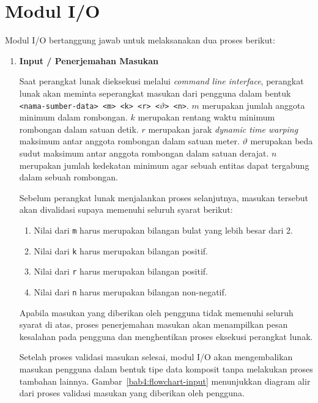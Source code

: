 \section{Modul I/O}
\label{sec:des-io}

Modul I/O bertanggung jawab untuk melaksanakan dua proses berikut:

\begin{enumerate}
    \item \textbf{Input / Penerjemahan Masukan}
    
    Saat perangkat lunak dieksekusi melalui \textit{command line interface}, perangkat lunak akan meminta seperangkat masukan dari pengguna dalam bentuk \texttt{<nama-sumber-data> <m> <k> <r> <$\vartheta$> <n>}. $m$ merupakan jumlah anggota minimum dalam rombongan. $k$ merupakan rentang waktu minimum rombongan dalam satuan detik. $r$ merupakan jarak \textit{dynamic time warping} maksimum antar anggota rombongan dalam satuan meter. $\vartheta$ merupakan beda sudut maksimum antar anggota rombongan dalam satuan derajat. $n$ merupakan jumlah kedekatan minimum agar sebuah entitas dapat tergabung dalam sebuah rombongan.
    
    Sebelum perangkat lunak menjalankan proses selanjutnya, masukan tersebut akan divalidasi supaya memenuhi seluruh syarat berikut:
    
    \begin{enumerate}
        \item Nilai dari \texttt{m} harus merupakan bilangan bulat yang lebih besar dari 2.
        \item Nilai dari \texttt{k} harus merupakan bilangan positif.
        \item Nilai dari \texttt{r} harus merupakan bilangan positif.
        \item Nilai dari \texttt{n} harus merupakan bilangan non-negatif.
    \end{enumerate}
    
    Apabila masukan yang diberikan oleh pengguna tidak memenuhi seluruh syarat di atas, proses penerjemahan masukan akan menampilkan pesan kesalahan pada pengguna dan menghentikan proses eksekusi perangkat lunak.
    
    Setelah proses validasi masukan selesai, modul I/O akan mengembalikan masukan pengguna dalam bentuk tipe data komposit tanpa melakukan proses tambahan lainnya. Gambar~\ref{bab4:flowchart-input} menunjukkan diagram alir dari proses validasi masukan yang diberikan oleh pengguna.
    

\end{enumerate}
